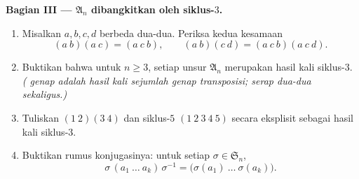 \begin{problem}
\medskip
\noindent\textbf{Bagian III --- $\mathfrak A_n$ dibangkitkan oleh
siklus-$3$.}
\begin{enumerate}[resume]
  \item Misalkan $a, b, c, d$ berbeda dua-dua. Periksa kedua
        kesamaan
        \[
        (a\ b)(a\ c) = (a\ c\ b),
        \qquad
        (a\ b)(c\ d) = (a\ c\ b)(a\ c\ d) .
        \]
  \item Buktikan bahwa untuk $n \geq 3$, setiap unsur $\mathfrak
        A_n$ merupakan hasil kali siklus-$3$. \emph{(
        genap adalah hasil kali sejumlah genap
        transposisi; serap dua-dua sekaligus.)}
  \item Tuliskan $(1\ 2)(3\ 4)$ dan siklus-$5$ $(1\ 2\ 3\ 4\ 5)$
        secara eksplisit sebagai hasil kali siklus-$3$.
  \item Buktikan rumus konjugasinya: untuk setiap $\sigma \in
        \mathfrak S_n$,
        \[
        \sigma\,(a_1\ \dots\ a_k)\,\sigma^{-1}
        = \bigl(\sigma(a_1)\ \dots\ \sigma(a_k)\bigr) .
        \]
\end{enumerate}


\end{problem}
